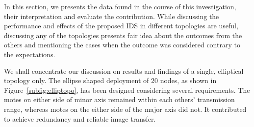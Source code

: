 \documentclass[conference]{IEEEtran}
\begin{document}
In this section, we presents the data found in the course of this investigation, their interpretation and evaluate the contribution.
While discussing the performance and effects of the proposed IDS in different topologies are useful, discussing any of the topologies presents fair idea about the outcomes from the others and mentioning the cases when the outcome was considered  contrary to the expectations.




We shall concentrate our discussion on results and findings of a single, elliptical topology only.
The ellipse shaped deployment of 20 nodes, as shown in Figure~\ref{subfig:elliptopo}, has been designed considering several requirements.
The motes on either side of minor axis remained within each others' transmission range, whereas motes on the either side of the major axis did not.
It contributed to achieve  redundancy and  reliable image transfer. 
\end{document}
